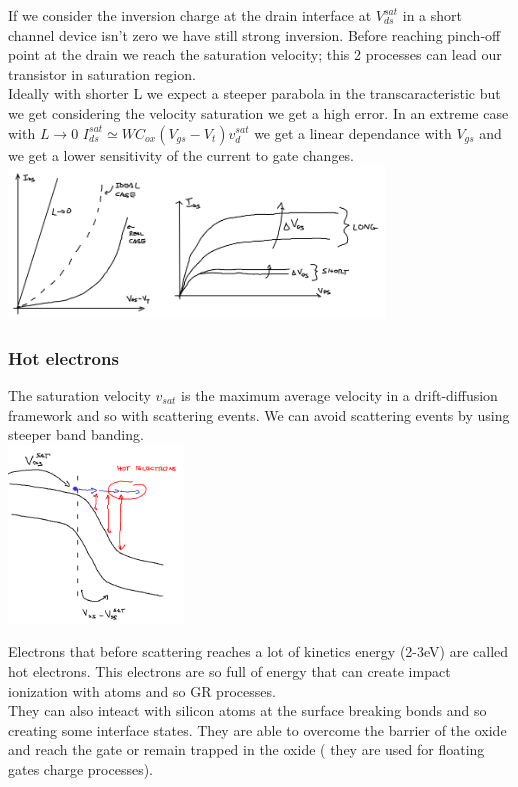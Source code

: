 If we consider the inversion charge at the drain interface at $V_{ds}^{sat}$ in a short channel device isn't zero we have still strong inversion. Before reaching pinch-off point at the drain we reach the saturation velocity; this 2 processes can lead our transistor in saturation region.\\
Ideally with shorter L we expect a steeper parabola in the transcaracteristic but we get considering the velocity saturation we get a high error. In an extreme case with $L\rightarrow 0$ $I_{ds}^{sat}\simeq WC_{ox}(V_{gs}-V_t)v_d^{sat}$ we get a linear dependance with $V_{gs}$ and we get a lower sensitivity of the current to gate changes.\\

\centering
\includegraphics[width=0.75\textwidth]{shorta.png}\\
\raggedright

\subsubsection{Hot electrons}
The saturation velocity $v_{sat}$ is the maximum average velocity in a drift-diffusion framework and so with scattering events. We can avoid scattering events by using steeper band banding.\\

\centering
\includegraphics[width=0.35\textwidth]{hotelectrons.png}\\
\raggedright

Electrons that before scattering reaches a lot of kinetics energy (2-3eV) are called hot electrons. This electrons are so full of energy that can create impact ionization with atoms and so GR processes.\\
They can also inteact with silicon atoms at the surface breaking bonds and so creating some interface states. They are able to overcome the barrier of the oxide and reach the gate or remain trapped in the oxide ( they are used for floating gates charge processes).\\



